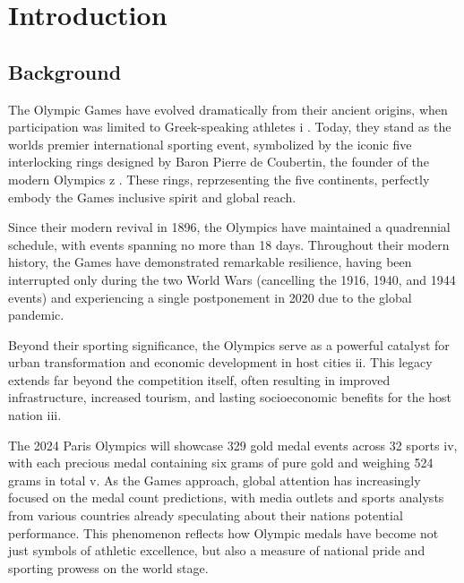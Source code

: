 \documentclass[12pt,a4paper]{article}
\begin{document}
    \newpage
    \tableofcontents
    \newpage

    
    \section{Introduction}
    
    \subsection{Background}
    
    The Olympic Games have evolved dramatically from their ancient
    origins, when participation was limited to Greek-speaking athletes i .
    Today, they stand as the world\textquotesingle s premier international
    sporting event, symbolized by the iconic five interlocking rings
    designed by Baron Pierre de Coubertin, the founder of the modern
    Olympics z . These rings, reprzesenting the five continents, perfectly
    embody the Games\textquotesingle{} inclusive spirit and global reach.
    
    Since their modern revival in 1896, the Olympics have maintained
    a quadrennial schedule, with events spanning no more than 18 days.
    Throughout their modern history, the Games have demonstrated remarkable
    resilience, having been interrupted only during the two World Wars
    (cancelling the 1916, 1940, and 1944 events) and experiencing a single
    postponement in 2020 due to the global pandemic.
    
    Beyond their sporting significance, the Olympics serve as a
    powerful catalyst for urban transformation and economic development in
    host cities ii. This legacy extends far beyond the competition itself,
    often resulting in improved infrastructure, increased tourism, and
    lasting socioeconomic benefits for the host nation iii.
        
    
    The 2024 Paris Olympics will showcase 329 gold medal events
    across 32 sports iv, with each precious medal containing six grams of
    pure gold and weighing 524 grams in total v. As the Games approach,
    global attention has increasingly focused on the medal count
    predictions, with media outlets and sports analysts from various
    countries already speculating about their nations\textquotesingle{}
    potential performance. This phenomenon reflects how Olympic medals have
    become not just symbols of athletic excellence, but also a measure of
    national pride and sporting prowess on the world stage.
    
\end{document}
